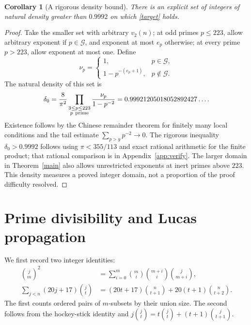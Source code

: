\documentclass[11pt,a4paper]{article}
\newtheorem{corollary}[theorem]{Corollary}
\theoremstyle{remark}\newtheorem{remark}[theorem]{Remark}
\begin{document}
\begin{corollary}[A rigorous density bound]\label{density}
There is an explicit set of integers of natural density
greater than \(0.9992\) on which \eqref{target} holds.
\end{corollary}
\begin{proof}
Take the smaller set with arbitrary \(v_2(n)\); at odd primes
\(p\le223\), allow arbitrary exponent if \(p\in\mathcal G\), and exponent
at most \(e_p\) otherwise; at every prime \(p>223\), allow exponent
at most one. Define
\[
 \nu_p=
 \begin{cases}
 1,&p\in\mathcal G,\\
 1-p^{-(e_p+1)},&p\notin\mathcal G.
 \end{cases}
\]
The natural density of this set is
\[
 \delta_0=\frac8{\pi^2}
       \prod_{\substack{3\le p\le223\\p\ {\rm prime}}}
       \frac{\nu_p}{1-p^{-2}}
       =0.99921205018052892427\ldots .
\]
Existence follows by the Chinese remainder theorem for finitely many
local conditions and the tail estimate \(\sum_{p>y}p^{-2}\to0\).
The rigorous inequality \(\delta_0>0.9992\) follows using
\(\pi<355/113\) and exact rational arithmetic for the finite product;
that rational comparison is in Appendix~\ref{app:verify}.
The larger domain in Theorem~\ref{main} also allows unrestricted
exponents at inert primes above \(223\).
This density measures a proved integer domain, not a proportion of
the proof difficulty resolved.
\end{proof}
\section{Prime divisibility and Lucas propagation}

We first record two integer identities:
\begin{align}
 \binom jm^2
 &=\sum_{i=0}^m\binom mi\binom{m+i}i\binom j{m+i},
 \label{product}\\
 \sum_{j<n}(20j+17)\binom jt
 &=(20t+17)\binom n{t+1}
       +20(t+1)\binom n{t+2}. \label{hockey}
\end{align}
The first counts ordered pairs of \(m\)-subsets by their union size.
The second follows from the hockey-stick identity and
\(j\binom jt=t\binom jt+(t+1)\binom j{t+1}\).
\end{document}
